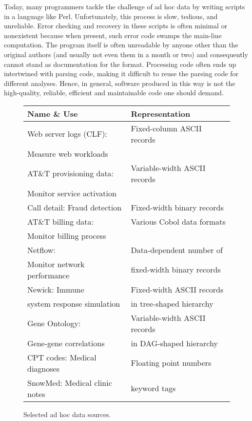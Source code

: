 Today, many programmers tackle the challenge of ad hoc data by writing
scripts in a language like Perl.  Unfortunately, this process is slow,
tedious, and unreliable.  Error checking and recovery in these scripts
is often minimal or nonexistent because when present, such error code
swamps the main-line computation.  The program itself is often
unreadable by anyone other than the original authors (and usually not
even them in a month or two) and consequently cannot stand as
documentation for the format.  Processing code often ends up
intertwined with parsing code, making it difficult to reuse the
parsing code for different analyses. Hence, in general, software
produced in this way is not the high-quality, reliable, efficient and
maintainable code one should demand.

\begin{figure}
\begin{center}
\begin{tabular}{|l|l|}
\hline
Name \& Use   &  Representation               \\ \hline\hline
Web server logs (CLF):  &  Fixed-column ASCII records \\ 
Measure web workloads &                             \\ \hline
AT\&T provisioning data: & Variable-width ASCII records  \\ 
Monitor service activation &                              \\ \hline
Call detail: Fraud detection  &  Fixed-width binary records \\  \hline 
AT\&T billing data: & Various Cobol data formats  \\ 
Monitor billing process   &                             \\ \hline
Netflow:                        & Data-dependent number of     \\ 
Monitor network performance  & fixed-width binary records  \\ \hline
Newick:   Immune                 & Fixed-width ASCII records \\ 
system response simulation & in tree-shaped hierarchy\\ \hline                                
Gene Ontology:             & Variable-width ASCII records \\
Gene-gene correlations     & in DAG-shaped hierarchy \\ \hline
CPT codes: Medical diagnoses & Floating point numbers \\ \hline
SnowMed: Medical clinic notes & keyword tags  \\ \hline


\end{tabular}


\caption{Selected ad hoc data sources.}
\label{figure:data-sources}
\end{center}
\end{figure}
 
